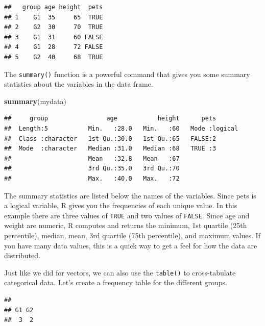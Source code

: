 \documentclass[
]{book}
\newenvironment{Shaded}{\begin{snugshade}}{\end{snugshade}}
\newcommand{\KeywordTok}[1]{\textcolor[rgb]{0.13,0.29,0.53}{\textbf{#1}}}
\newcommand{\NormalTok}[1]{#1}
\newcommand{\OperatorTok}[1]{\textcolor[rgb]{0.81,0.36,0.00}{\textbf{#1}}}
\begin{document}
\begin{verbatim}
##   group age height  pets
## 1    G1  35     65  TRUE
## 2    G2  30     70  TRUE
## 3    G1  31     60 FALSE
## 4    G1  28     72 FALSE
## 5    G2  40     68  TRUE
\end{verbatim}

The \texttt{summary()} function is a powerful command that gives you some summary statistics about the variables in the data frame.

\begin{Shaded}
\begin{Highlighting}[]
\KeywordTok{summary}\NormalTok{(mydata)}
\end{Highlighting}
\end{Shaded}

\begin{verbatim}
##     group                age           height      pets        
##  Length:5           Min.   :28.0   Min.   :60   Mode :logical  
##  Class :character   1st Qu.:30.0   1st Qu.:65   FALSE:2        
##  Mode  :character   Median :31.0   Median :68   TRUE :3        
##                     Mean   :32.8   Mean   :67                  
##                     3rd Qu.:35.0   3rd Qu.:70                  
##                     Max.   :40.0   Max.   :72
\end{verbatim}

The summary statistics are listed below the names of the variables. Since pets is a logical variable, R gives you the frequencies of each unique value. In this example there are three values of \texttt{TRUE} and two values of \texttt{FALSE}. Since age and weight are numeric, R computes and returns the minimum, 1st quartile (25th percentile), median, mean, 3rd quartile (75th percentile), and maximum values. If you have many data values, this is a quick way to get a feel for how the data are distributed.

Just like we did for vectors, we can also use the \texttt{table()} to cross-tabulate categorical data. Let's create a frequency table for the different groups.

\begin{Shaded}
\end{Shaded}

\begin{verbatim}
## 
## G1 G2 
##  3  2
\end{verbatim}
\end{document}
